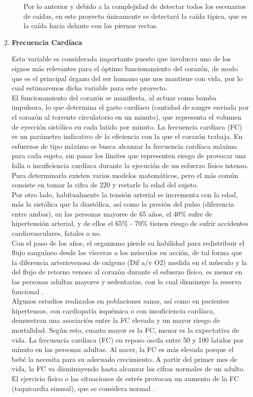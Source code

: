 \begin{enumerate}
\begin{itemize}
	 Por lo anterior y debido a la complejidad de detectar todos los escenarios de caídas, en este proyecto únicamente se detectará la caída típica, que es la caída hacia delante con las piernas rectas.
	\end{itemize}

	\item \textbf{Frecuencia Cardíaca}
	
	Esta variable es considerada importante puesto que involucra uno de los signos más relevantes para el óptimo funcionamiento del corazón, de modo que es el principal órgano del ser humano que nos mantiene con vida, por lo cual estimaremos dicha variable para este proyecto. \\
	
	El funcionamiento del corazón se manifiesta, al actuar como bomba impulsora, lo que determina el gasto cardíaco (cantidad de sangre enviada por el corazón al torrente circulatorio en un minuto), que representa el volumen de eyección sistólico en cada latido por minuto. La frecuencia cardíaca (FC) es un parámetro indicativo de la eficiencia con la que el corazón trabaja. En esfuerzos de tipo máximo se busca alcanzar la frecuencia cardíaca máxima para cada sujeto, sin pasar los límites que representen riesgo de provocar una falla o insuficiencia cardíaca durante la ejecución de un esfuerzo físico intenso. Para determinarla existen varios modelos matemáticos, pero el más común consiste en tomar la cifra de 220 y restarle la edad del sujeto. \\
	
	Por otro lado, habitualmente la tensión arterial se incrementa con la edad, más la sistólica que la diastólica, así como la presión del pulso (diferencia entre ambas), en las personas mayores de 65 años, el 40\% sufre de hipertensión arterial, y de ellos el 65\% - 70\% tienen riesgo de sufrir accidentes cardiovasculares, fatales o no. \\
	
	Con el paso de los años, el organismo pierde su habilidad para redistribuir el flujo sanguíneo desde las vísceras a los músculos en acción, de tal forma que la diferencia arteriovenosa de oxígeno (Dif a/v O2) medida en el músculo y la del flujo de retorno venoso al corazón durante el esfuerzo físico, es menor en las personas adultas mayores y sedentarias, con lo cual disminuye la reserva funcional \cite{catorce}. \\
	
	Algunos estudios realizados en poblaciones sanas, así como en pacientes hipertensos, con cardiopatía isquémica o con insuficiencia cardíaca, demuestran una asociación entre la FC elevada y un mayor riesgo de mortalidad. Según esto, cuanto mayor es la FC, menor es la expectativa de vida. La frecuencia cardíaca (FC) en reposo oscila entre 50 y 100 latidos por minuto en las personas adultas. Al nacer, la FC es más elevada porque el bebé la necesita para su adecuado crecimiento. A partir del primer mes de vida, la FC va disminuyendo hasta alcanzar las cifras normales de un adulto. El ejercicio físico o las situaciones de estrés provocan un aumento de la FC (taquicardia sinusal), que se considera normal \cite{quince}.
	

\end{enumerate}
